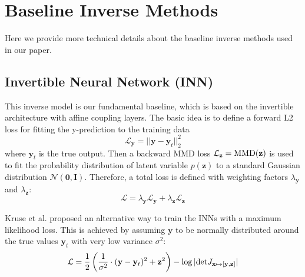 \documentclass[letterpaper]{article} %
\begin{document}
\section{Baseline Inverse Methods}
\label{Baseline Methods}
Here we provide more technical details about the baseline inverse methods used in our paper. 
\subsection{Invertible Neural Network (INN)}
This inverse model is our fundamental baseline, which is based on the invertible architecture with affine coupling layers. The basic idea is to define a forward L2 loss for fitting the y-prediction to the training data 
\begin{equation}
    \mathcal{L}_{\mathbf{y}} = ||\mathbf{y}-\mathbf{y}_t||_2^2
\end{equation}
where $\mathbf{y}_t$ is the true output. Then a backward MMD loss $\mathcal{L}_{\mathbf{z}}=\textup{MMD}(\mathbf{z})$ is used to fit the probability distribution of latent variable $p(\mathbf{z})$ to a standard Gaussian distribution $\mathcal{N}(\mathbf{0}, \mathbf{I})$. Therefore, a total loss is defined with weighting factors $\lambda_{\mathbf{y}}$ and $\lambda_{\mathbf{z}}$:
\begin{equation}
    \mathcal{L} = \lambda_{\mathbf{y}} \mathcal{L}_{\mathbf{y}} + \lambda_{\mathbf{z}} \mathcal{L}_{\mathbf{z}}
\end{equation}

Kruse et al.\cite{kruse2021benchmarking} proposed an alternative way to train the INNs with a maximum likelihood loss. This is achieved by assuming $\mathbf{y}$ to be normally distributed around the true values $\mathbf{y}_t$ with very low variance $\sigma^2$: 
\begin{equation}
    \mathcal{L} = \frac{1}{2} \left(\frac{1}{\sigma^2} \cdot (\mathbf{y} - \mathbf{y}_t)^2 + \mathbf{z}^2 \right) - \log |\textup{det} J_{\mathbf{x} \mapsto [\mathbf{y},\mathbf{z}]} |
\end{equation}
\end{document}
